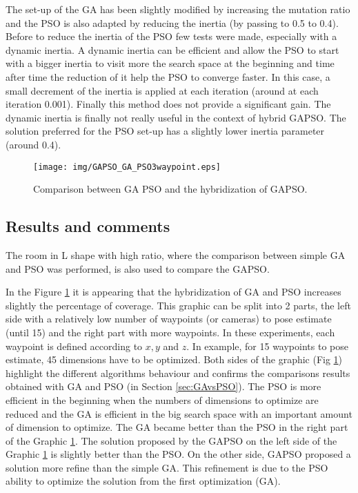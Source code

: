The set-up of the GA has been slightly modified by increasing the mutation ratio and the PSO is also adapted by reducing the inertia (by passing to 0.5 to 0.4).
 Before to reduce the inertia of the PSO few tests were made, especially with a dynamic inertia. A dynamic inertia can be efficient and allow the PSO to start with a bigger inertia to visit more the search space at the beginning and time after time the reduction of it help the PSO to converge faster. In this case, a small decrement of the inertia is applied at each iteration (around at each iteration 0.001). Finally this method does not provide a significant gain. The dynamic inertia is finally  not really useful in the context of hybrid GAPSO. The solution  preferred for the PSO set-up has a slightly lower inertia parameter (around 0.4).

\begin{figure}[t]
  \texttt{[image: img/GAPSO\_GA\_PSO3waypoint.eps]}
  \caption{Comparison between GA PSO and the hybridization of GAPSO.
}\label{fig:GAPSO}
  \endminipage\hfill
\end{figure}

 \subsection{Results and comments }
  

The room in L shape with high ratio, where the comparison between simple GA and PSO was performed, is also used to compare the GAPSO. %

In the Figure \ref{fig:GAPSO} it is appearing that the hybridization of GA and PSO increases slightly the percentage of coverage.%
This graphic can be split into 2 parts, the left side with a relatively low number of waypoints (or cameras) to pose estimate (until 15) and the right part with more waypoints. In these experiments, each waypoint is defined according to $x, y$ and $z$. In example, for 15 waypoints to pose estimate, 45 dimensions have to be optimized.
Both sides of the graphic (Fig \ref{fig:GAPSO}) highlight  the different algorithms behaviour and confirms the comparisons results obtained with GA and PSO (in Section \ref{sec:GAvsPSO}).
The PSO is more efficient in the beginning when the numbers of dimensions to optimize are reduced and the GA is efficient in the big search space with an important amount of dimension to optimize. The GA became better than the PSO in the right part of the Graphic \ref{fig:GAPSO}. 
The solution  proposed by the GAPSO on the left side of the Graphic \ref{fig:GAPSO} is slightly better than the PSO. On the other side, GAPSO proposed a solution more refine than the simple GA. This refinement is due to the PSO ability to optimize the solution from the first optimization (GA). 

